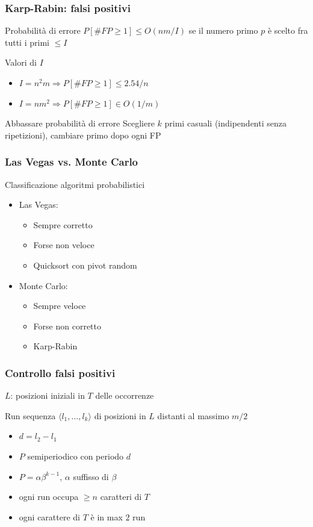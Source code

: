 \begin{frame}[fragile]
\frametitle{Karp-Rabin: falsi positivi}
\begin{block}{Probabilità di errore}
$P[\#FP\ge 1] \le O(nm/I)$ se il numero primo $p$ è scelto fra tutti i primi $\le
I$
\end{block}

\begin{block}{Valori di $I$}
\begin{itemize}
\item
$I=n^{2}m \Rightarrow P[\#FP\ge 1] \le 2.54/n$
\item
$I=nm^{2}  \Rightarrow P[\#FP\ge 1] \in O(1/m)$
\end{itemize}
\end{block}

\begin{block}{Abbassare probabilità di errore}
Scegliere $k$ primi casuali (indipendenti senza ripetizioni), cambiare primo
dopo ogni FP
\end{block}
\end{frame}

\begin{frame}[fragile]
\frametitle{Las Vegas vs.
  Monte Carlo}
\begin{block}{Classificazione algoritmi probabilistici}
\begin{itemize}
\item
Las Vegas:
\begin{itemize}
\item
Sempre corretto
\item
Forse non veloce
\item
Quicksort con pivot random
\end{itemize}
\item
Monte Carlo:
\begin{itemize}
\item
Sempre veloce

\item
Forse non corretto
\item
Karp-Rabin
\end{itemize}
\end{itemize}
\end{block}
\end{frame}


\begin{frame}[fragile]
\frametitle{Controllo falsi positivi}
$L$: posizioni iniziali in $T$ delle occorrenze
\begin{block}{Run}
sequenza $\langle l_{1}, \ldots, l_{k}\rangle$ di posizioni in $L$ distanti al
massimo $m/2$
\end{block}

\begin{itemize}
\item
$d=l_{2}-l_{1}$
\item
$P$ semiperiodico con periodo $d$
\item
$P=\alpha\beta^{k-1}$, $\alpha$ suffisso di $\beta$
\item
ogni run occupa $\ge n$ caratteri di $T$
\item
ogni carattere  di $T$ è in max $2$ run
\end{itemize}
\end{frame}


